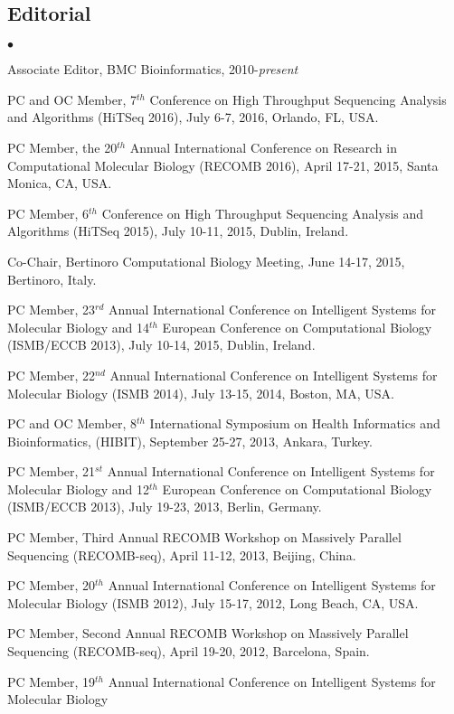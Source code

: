 \documentclass[margin,line]{res}
\newenvironment{list2}{
  \begin{list}{$\bullet$}{%
      \setlength{\itemsep}{0in}
      \setlength{\parsep}{0in} \setlength{\parskip}{0in}
      \setlength{\topsep}{0in} \setlength{\partopsep}{0in} 
      \setlength{\leftmargin}{0.2in}}}{\end{list}}
\begin{document}
\begin{resume}
\subsection{\small \sc Editorial}
\begin{list2}
\item
  Associate Editor, BMC Bioinformatics, 2010-{\it present}
\item
  PC and OC Member, 7$^{th}$ Conference on High Throughput Sequencing Analysis and Algorithms (HiTSeq 2016), July 6-7, 2016, Orlando, FL, USA.
\item
  PC Member, the 20$^{th}$ Annual International Conference on Research in Computational Molecular Biology
  (RECOMB 2016), April 17-21, 2015, Santa Monica, CA, USA.
\item
  PC Member, 6$^{th}$ Conference on High Throughput Sequencing Analysis and Algorithms (HiTSeq 2015), July 10-11, 2015, Dublin, Ireland.
\item
  Co-Chair, Bertinoro Computational Biology Meeting, June 14-17, 2015, Bertinoro, Italy.
\item
  PC Member, 23$^{rd}$ Annual International Conference on Intelligent Systems for Molecular Biology and 14$^{th}$ European Conference on 
  Computational Biology  (ISMB/ECCB 2013), 
  July 10-14, 2015, Dublin, Ireland.
\item
  PC Member, 22$^{nd}$ Annual International Conference on Intelligent Systems for Molecular Biology 
  (ISMB 2014), 
  July 13-15, 2014, Boston, MA, USA.
\item
  PC and OC Member, 8$^{th}$  International Symposium on Health Informatics and Bioinformatics, (HIBIT),
  September 25-27, 2013, Ankara, Turkey.
\item
  PC Member, 21$^{st}$ Annual International Conference on Intelligent Systems for Molecular Biology and 12$^{th}$ European Conference on 
  Computational Biology  (ISMB/ECCB 2013), 
  July 19-23, 2013, Berlin, Germany.
\item
  PC Member, Third Annual RECOMB Workshop on Massively Parallel Sequencing (RECOMB-seq), April 11-12, 2013, Beijing, China.
\item
  PC Member, 20$^{th}$ Annual International Conference on Intelligent Systems for Molecular Biology
  (ISMB 2012), July 15-17, 2012, Long Beach, CA, USA. 
\item
  PC Member, Second Annual RECOMB Workshop on Massively Parallel Sequencing (RECOMB-seq), April 19-20, 2012, Barcelona, Spain.
\item
  PC Member, 19$^{th}$ Annual International Conference on Intelligent Systems for Molecular Biology

\end{list2}
\end{resume}
\end{document}
